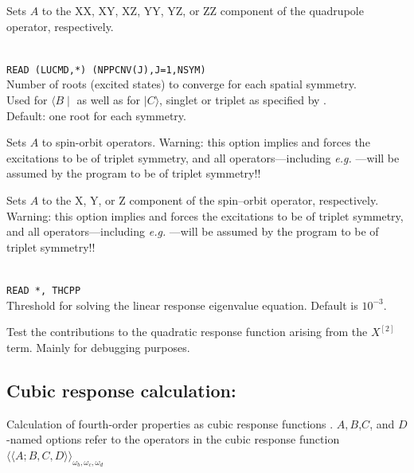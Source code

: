 \begin{description}
\item{}
Sets $A$ to the XX, XY, XZ, YY, YZ, or ZZ component of the
quadrupole operator, respectively.

\item{}\\
\verb|READ (LUCMD,*) (NPPCNV(J),J=1,NSYM)|\\
Number of roots (excited states) to converge for each spatial symmetry.\\
Used for $\langle B \mid$ as well as for $ \mid C \rangle$,
singlet or triplet as specified by .\\
Default: one root for each symmetry.

\item{}
Sets $A$ to spin-orbit operators.
Warning: this option implies  and
forces the excitations to be of triplet symmetry,
and all operators---including
{\it e.g.\/} ---will be assumed by the program to be of triplet symmetry!!

\item{}
Sets $A$ to the X, Y, or Z component of the spin--orbit
operator, respectively.
Warning: this option implies  and
forces the excitations to be of triplet symmetry,
and all operators---including
{\it e.g.\/} ---will be assumed by the program to be of triplet symmetry!!

\item{}\\
\verb|READ *, THCPP|\\
Threshold for solving the linear response
eigenvalue equation. Default is $10^{-3}$.

\item{}
Test the contributions to the quadratic response function arising from
the $X^{\left[2\right]}$ term. Mainly for debugging purposes.
\end{description}


\subsection{Cubic response calculation: }
Calculation of fourth-order properties as cubic response functions
\cite{pndjovhacpl242,djpnhajcp105,pndjhapdkrthhkcpl253}.
$A,B$,$C$, and $D$-named options refer to the operators in the cubic
response function
$\langle\!\langle A;B,C,D \rangle\!\rangle_{\omega_b,\omega_c,\omega_d}$


